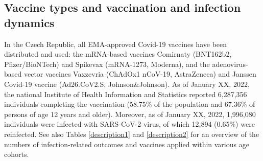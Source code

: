 \documentclass[preprint,12pt,authoryear]{elsarticle}
\begin{document}
\subsection{Vaccine types and vaccination and infection dynamics}

In the Czech Republic, all EMA-approved Covid-19 vaccines have been distributed and used: the mRNA-based vaccines Comirnaty (BNT162b2, Pfizer/BioNTech) and Spikevax (mRNA-1273, Moderna), and the adenovirus-based vector vaccines Vaxzevria (ChAdOx1 nCoV-19, AstraZeneca) and Janssen Covid-19 vaccine (Ad26.CoV2.S, Johnson\&Johnson). 
As of January XX, 2022, the national Institute of Health Information and Statistics reported 6,287,356 individuals completing the vaccination (58.75\% of the population and 67.36\% of persons of age 12 years and older).%
Moreover, as of January XX, 2022, 1,996,080 individuals were infected with SARS-CoV-2 virus, of which 12,894 (0.65\%) were reinfected.%
See also Tables \ref{description1} and \ref{description2} for an overview of the numbers of infection-related outcomes and vaccines applied within various age cohorts.


\end{document}
